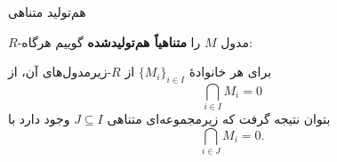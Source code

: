\begin{frame}[t]{هم‌تولید متناهی}
    \label{lec10:finite-cogeneration}
    \begin{definition}
        $R$-مدول $M$ را \textbf{متناهیاً هم‌تولیدشده} گوییم هرگاه:

        برای هر خانوادهٔ $\{M_i\}_{i\in I}$ از $R$-زیرمدول‌های آن،
        از
        \[
            \bigcap_{i\in I}M_i=0
        \]
        بتوان نتیجه گرفت که زیرمجموعه‌ای متناهی $J\subseteq I$ وجود دارد با
        \[
            \bigcap_{i\in J}M_i=0.
        \]
    \end{definition}
\end{frame}
